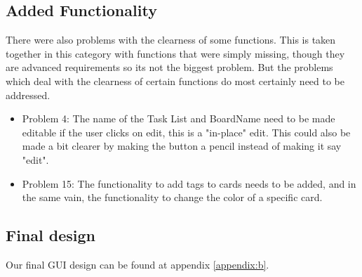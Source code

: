 \subsection{Added Functionality}
There were also problems with the clearness of some functions. This is taken together in this category with functions that were simply missing, though they are advanced requirements so its not the biggest problem. But the problems which deal with the clearness of certain functions do most certainly need to be addressed.
\begin{itemize}
    \item Problem 4: The name of the Task List and BoardName need to be made editable if the user clicks on edit, this is a "in-place" edit. This could also be made a bit clearer by making the button a pencil instead of making it say "edit".
    \item Problem 15: The functionality to add tags to cards needs to be added, and in the same vain, the functionality to change the color of a specific card.
\end{itemize}
\subsection{Final design}
Our final GUI design can be found at appendix \ref{appendix:b}.